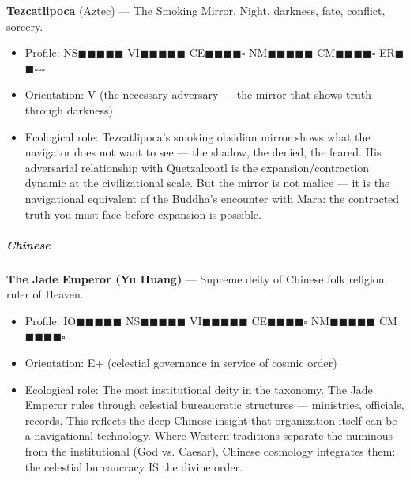 \textbf{Tezcatlipoca} (Aztec) — The Smoking Mirror. Night, darkness, fate, conflict, sorcery.

\begin{itemize}[nosep,leftmargin=*]
  \item Profile: NS$\blacksquare$$\blacksquare$$\blacksquare$$\blacksquare$$\blacksquare$ VI$\blacksquare$$\blacksquare$$\blacksquare$$\blacksquare$$\blacksquare$ CE$\blacksquare$$\blacksquare$$\blacksquare$$\blacksquare$$\square$ NM$\blacksquare$$\blacksquare$$\blacksquare$$\blacksquare$$\blacksquare$ CM$\blacksquare$$\blacksquare$$\blacksquare$$\blacksquare$$\square$ ER$\blacksquare$$\blacksquare$$\square$$\square$$\square$
  \item Orientation: V (the necessary adversary — the mirror that shows truth through darkness)
  \item Ecological role: Tezcatlipoca's smoking obsidian mirror shows what the navigator does not want to see — the shadow, the denied, the feared. His adversarial relationship with Quetzalcoatl is the expansion/\allowbreak contraction dynamic at the civilizational scale. But the mirror is not malice — it is the navigational equivalent of the Buddha's encounter with Mara: the contracted truth you must face before expansion is possible.
\end{itemize}


\subparagraph*{Chinese}


\textbf{The Jade Emperor (Yu Huang)} — Supreme deity of Chinese folk religion, ruler of Heaven.

\begin{itemize}[nosep,leftmargin=*]
  \item Profile: IO$\blacksquare$$\blacksquare$$\blacksquare$$\blacksquare$$\blacksquare$ NS$\blacksquare$$\blacksquare$$\blacksquare$$\blacksquare$$\blacksquare$ VI$\blacksquare$$\blacksquare$$\blacksquare$$\blacksquare$$\blacksquare$ CE$\blacksquare$$\blacksquare$$\blacksquare$$\blacksquare$$\square$ NM$\blacksquare$$\blacksquare$$\blacksquare$$\blacksquare$$\blacksquare$ CM$\blacksquare$$\blacksquare$$\blacksquare$$\blacksquare$$\square$
  \item Orientation: E+ (celestial governance in service of cosmic order)
  \item Ecological role: The most institutional deity in the taxonomy. The Jade Emperor rules through celestial bureaucratic structures — ministries, officials, records. This reflects the deep Chinese insight that organization itself can be a navigational technology. Where Western traditions separate the numinous from the institutional (God vs. Caesar), Chinese cosmology integrates them: the celestial bureaucracy IS the divine order.
\end{itemize}


